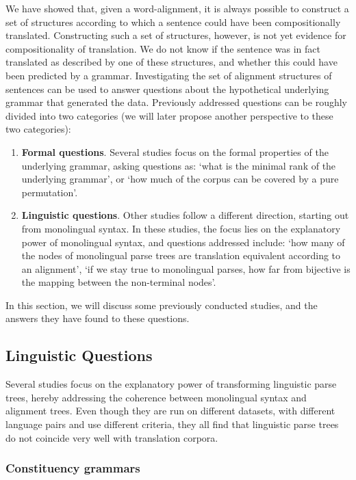 We have showed that, given a word-alignment, it is always possible to construct a set of structures according to which a sentence could have been compositionally translated. Constructing such a set of structures, however, is not yet evidence for compositionality of translation. We do not know if the sentence was in fact translated as described by one of these structures, and whether this could have been predicted by a grammar. Investigating the set of alignment structures of sentences can be used to answer questions about the hypothetical underlying grammar that generated the data. Previously addressed questions can be roughly divided into two categories (we will later propose another perspective to these two categories):\begin{enumerate}%
\item \textbf{Formal questions}. Several studies focus on the formal properties of the underlying grammar, asking questions as: `what is the minimal rank of the underlying grammar', or `how much of the corpus can be covered by a pure permutation'.
\item \textbf{Linguistic questions}. Other studies follow a different direction, starting out from monolingual syntax. In these studies, the focus lies on the explanatory power of monolingual syntax, and questions addressed include: `how many of the nodes of monolingual parse trees are translation equivalent according to an alignment', `if we stay true to monolingual parses, how far from bijective is the mapping between the non-terminal nodes'.
\end{enumerate}

In this section, we will discuss some previously conducted studies, and the answers they have found to these questions.

\subsection{Linguistic Questions}

Several studies focus on the explanatory power of transforming linguistic parse trees, hereby addressing the coherence between monolingual syntax and alignment trees. Even though they are run on different datasets, with different language pairs and use different criteria, they all find that linguistic parse trees do not coincide very well with translation corpora.

\subsubsection{Constituency grammars}

